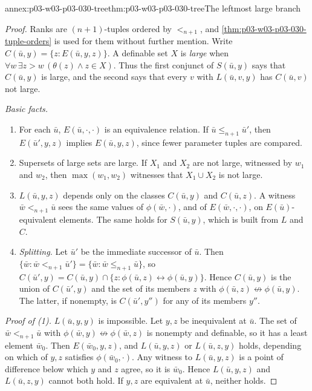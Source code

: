 \begin{annexitem}{annex:p03-w03-p03-030-tree}{thm:p03-w03-p03-030-tree}{The leftmost large branch}
\begin{proof}
Ranks are \((n+1)\)-tuples ordered by \(<_{n+1}\), and
\cref{thm:p03-w03-p03-030-tuple-orders} is used for them without further
mention.  Write \(C(\bar u,y)=\{z:E(\bar u,y,z)\}\).  A definable set \(X\)
is \emph{large} when \(\forall w\,\exists z>w\,(\theta(z)\wedge z\in X)\).
Thus the first conjunct of \(S(\bar u,y)\) says that \(C(\bar u,y)\) is
large, and the second says that every \(v\) with \(L(\bar u,v,y)\) has
\(C(\bar u,v)\) not large.

\emph{Basic facts.}
\begin{enumerate}
\item[(i)] For each \(\bar u\), \(E(\bar u,\cdot,\cdot)\) is an equivalence
  relation.  If \(\bar u\le_{n+1}\bar u'\), then \(E(\bar u',y,z)\) implies
  \(E(\bar u,y,z)\), since fewer parameter tuples are compared.
\item[(ii)] Supersets of large sets are large.  If \(X_1\) and \(X_2\) are not
  large, witnessed by \(w_1\) and \(w_2\), then \(\max(w_1,w_2)\) witnesses that
  \(X_1\cup X_2\) is not large.
\item[(iii)] \(L(\bar u,y,z)\) depends only on the classes \(C(\bar u,y)\) and
  \(C(\bar u,z)\).  A witness \(\bar w<_{n+1}\bar u\) sees the same values of
  \(\phi(\bar w,\cdot)\), and of \(E(\bar w,\cdot,\cdot)\), on
  \(E(\bar u)\)-equivalent elements.  The same holds for \(S(\bar u,y)\),
  which is built from \(L\) and \(C\).
\item[(iv)] \emph{Splitting.}  Let \(\bar u'\) be the immediate successor of
  \(\bar u\).  Then \(\{\bar w:\bar w<_{n+1}\bar u'\}=\{\bar w:\bar
  w\le_{n+1}\bar u\}\), so \(C(\bar u',y)=C(\bar u,y)\cap\{z:\phi(\bar
  u,z)\leftrightarrow\phi(\bar u,y)\}\).  Hence \(C(\bar u,y)\) is the union
  of \(C(\bar u',y)\) and the set of its members \(z\) with
  \(\phi(\bar u,z)\not\leftrightarrow\phi(\bar u,y)\).  The latter, if
  nonempty, is \(C(\bar u',y'')\) for any of its members \(y''\).
\end{enumerate}

\emph{Proof of (1).}  \(L(\bar u,y,y)\) is impossible.  Let \(y,z\) be
inequivalent at \(\bar u\).  The set of \(\bar w<_{n+1}\bar u\) with
\(\phi(\bar w,y)\not\leftrightarrow\phi(\bar w,z)\) is nonempty and definable,
so it has a least element \(\bar w_0\).  Then \(E(\bar w_0,y,z)\), and
\(L(\bar u,y,z)\) or \(L(\bar u,z,y)\) holds, depending on which of \(y,z\)
satisfies \(\phi(\bar w_0,\cdot)\).  Any witness to \(L(\bar u,y,z)\) is a
point of difference below which \(y\) and \(z\) agree, so it is \(\bar
w_0\).  Hence \(L(\bar u,y,z)\) and \(L(\bar u,z,y)\) cannot both hold.  If
\(y,z\) are equivalent at \(\bar u\), neither holds.


\end{proof}
\end{annexitem}
